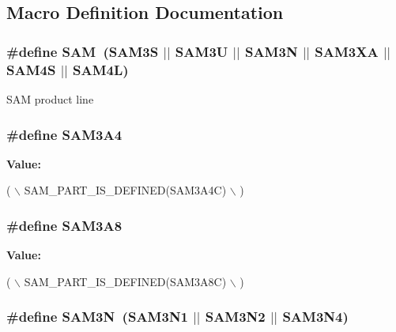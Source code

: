 \subsection{Macro Definition Documentation}
\hypertarget{group__sam__part__macros__group_ga0184d5fd98854f0e40eef3a27de91fed}{
\subsubsection[{S\-A\-M}]{\setlength{\rightskip}{0pt plus 5cm}\#define S\-A\-M~({\bf S\-A\-M3\-S} $|$$|$ {\bf S\-A\-M3\-U} $|$$|$ {\bf S\-A\-M3\-N} $|$$|$ {\bf S\-A\-M3\-X\-A} $|$$|$ {\bf S\-A\-M4\-S} $|$$|$ {\bf S\-A\-M4\-L})}}\label{group__sam__part__macros__group_ga0184d5fd98854f0e40eef3a27de91fed}
S\-A\-M product line \hypertarget{group__sam__part__macros__group_ga1f4481b0cd1b2c1a4636999b6a433b9f}{
\subsubsection[{S\-A\-M3\-A4}]{\setlength{\rightskip}{0pt plus 5cm}\#define S\-A\-M3\-A4}}\label{group__sam__part__macros__group_ga1f4481b0cd1b2c1a4636999b6a433b9f}
{\bfseries Value\-:}
\begin{DoxyCode}
( \(\backslash\)
        SAM\_PART\_IS\_DEFINED(SAM3A4C) \(\backslash\)
        )
\end{DoxyCode}
\hypertarget{group__sam__part__macros__group_gab1397a5e346af96e5ed34027ed3b4de8}{
\subsubsection[{S\-A\-M3\-A8}]{\setlength{\rightskip}{0pt plus 5cm}\#define S\-A\-M3\-A8}}\label{group__sam__part__macros__group_gab1397a5e346af96e5ed34027ed3b4de8}
{\bfseries Value\-:}
\begin{DoxyCode}
( \(\backslash\)
        SAM\_PART\_IS\_DEFINED(SAM3A8C) \(\backslash\)
        )
\end{DoxyCode}
\hypertarget{group__sam__part__macros__group_ga52239420b96aa3f1a273665cfd3b60a1}{
\subsubsection[{S\-A\-M3\-N}]{\setlength{\rightskip}{0pt plus 5cm}\#define S\-A\-M3\-N~({\bf S\-A\-M3\-N1} $|$$|$ {\bf S\-A\-M3\-N2} $|$$|$ {\bf S\-A\-M3\-N4})}}\label{group__sam__part__macros__group_ga52239420b96aa3f1a273665cfd3b60a1}
